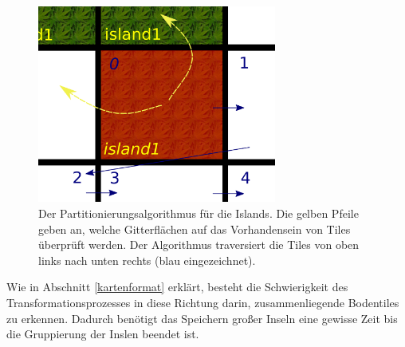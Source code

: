 %
%
\begin{figure}[htbp]
  \centering

    \includegraphics[width=0.7\textwidth]{gfx/merge_algorithm.png}

  \caption{Der Partitionierungsalgorithmus für die Islands. Die gelben Pfeile
  geben an, welche Gitterflächen auf das Vorhandensein von Tiles überprüft
  werden. Der Algorithmus traversiert die Tiles von oben links nach unten
  rechts (blau eingezeichnet).}
  \label{figure:automaton-intersection}
\end{figure}

Wie in Abschnitt \ref{kartenformat} erklärt, besteht die Schwierigkeit des
Transformationsprozesses in diese Richtung darin, zusammenliegende Bodentiles zu
erkennen. Dadurch benötigt das Speichern großer Inseln eine gewisse Zeit bis die
Gruppierung der Inslen beendet ist.
